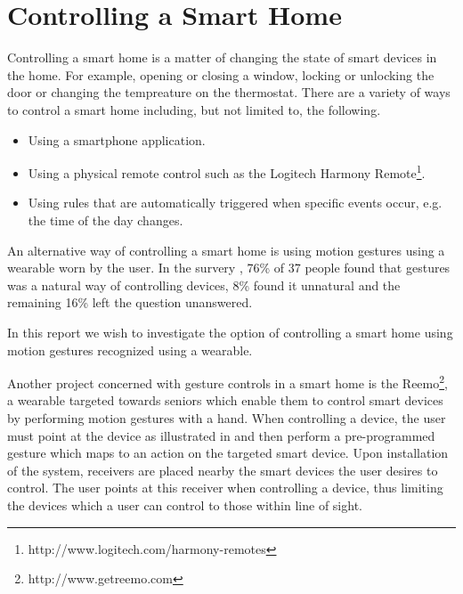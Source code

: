 \section{Controlling a Smart Home}
\label{sec:introduction:gesture-control}

Controlling a smart home is a matter of changing the state of smart devices in the home. For example, opening or closing a window, locking or unlocking the door or changing the tempreature on the thermostat. There are a variety of ways to control a smart home including, but not limited to, the following.

\begin{itemize}
\item Using a smartphone application.
\item Using a physical remote control such as the Logitech Harmony Remote\footnote{http://www.logitech.com/harmony-remotes}.
\item Using rules that are automatically triggered when specific events occur, e.g. the time of the day changes.
\end{itemize}

An alternative way of controlling a smart home is using motion gestures using a wearable worn by the user. In the survery \cite{Kela2006}, 76\% of 37 people found that gestures was a natural way of controlling devices, 8\% found it unnatural and the remaining 16\% left the question unanswered.

In this report we wish to investigate the option of controlling a smart home using motion gestures recognized using a wearable.

Another project concerned with gesture controls in a smart home is the Reemo\footnote{http://www.getreemo.com}, a wearable targeted towards seniors which enable them to control smart devices by performing motion gestures with a hand. When controlling a device, the user must point at the device as illustrated in  and then perform a pre-programmed gesture which maps to an action on the targeted smart device. Upon installation of the system, receivers are placed nearby the smart devices the user desires to control. The user points at this receiver when controlling a device, thus limiting the devices which a user can control to those within line of sight.

